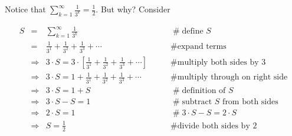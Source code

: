 \documentclass[11pt, oneside]{article}   	%
\begin{document}
Notice that  $\sum\limits_{k = 1}^\infty \frac{1}{3^k}  = \frac{1}{2}$. But why? Consider 
      
\begin{equation*}
\begin{array}{lllll}
S
&=& \sum\limits_{k = 1}^\infty \frac{1}{3^k}                                                                              &\qquad  \mathrel{\#} \text{define $S$}                             \\ 
&=& \frac{1}{3^1} + \frac{1}{3^2} + \frac{1}{3^3} + \cdots                                                        &\qquad  \mathrel{\#} \text{expand terms}                         \\
&\Rightarrow& 3 \cdot S = 3 \cdot [\frac{1}{3^1} + \frac{1}{3^2} + \frac{1}{3^3} + \cdots ]      &\qquad  \mathrel{\#} \text{multiply both sides by 3}          \\
&\Rightarrow& 3 \cdot S = 1 + \frac{1}{3^1} + \frac{1}{3^2} + \frac{1}{3^3} + \cdots               &\qquad  \mathrel{\#} \text{multiply through on right side} \\
&\Rightarrow& 3 \cdot S = 1 + S                                                                                             &\qquad  \mathrel{\#} \text{definition of $S$}                      \\
&\Rightarrow& 3 \cdot S - S = 1                                                                                              &\qquad  \mathrel{\#} \text{subtract $S$ from both sides}  \\
&\Rightarrow& 2 \cdot S  = 1                                                                                                  &\qquad  \mathrel{\#} 3 \cdot S - S = 2 \cdot S                    \\
&\Rightarrow& S  = \frac{1}{2}                                                                                                &\qquad  \mathrel{\#} \text{divide both sides by 2} 
\end{array}
\end{equation*}
\end{document}
